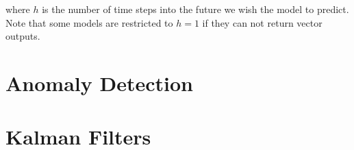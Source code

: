 \noindent where $h$ is
the number of time steps into the future we wish the model to predict.
Note that some models are restricted to $h=1$ if they can not return vector outputs.


\section{Anomaly Detection}
\label{time_series:anomaly_detection}


\section{Kalman Filters}
\label{time_series:kalman_filters}
